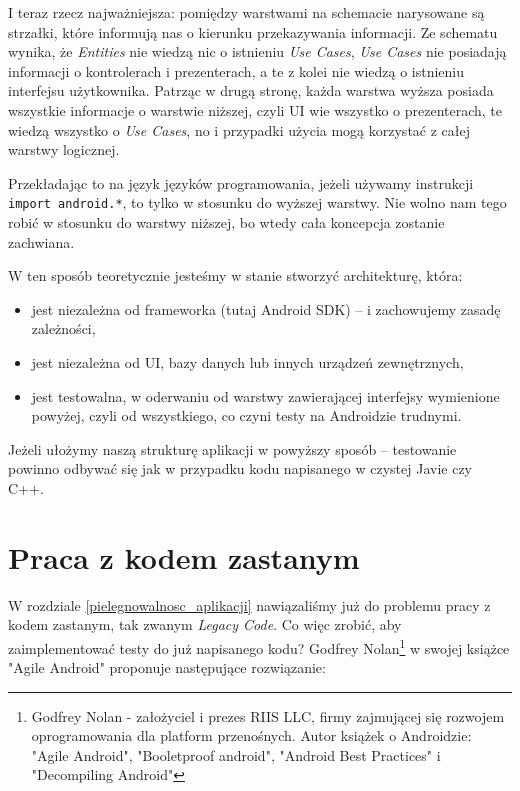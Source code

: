 I teraz rzecz najważniejsza: pomiędzy warstwami na schemacie narysowane są strzałki, które informują nas o kierunku przekazywania informacji. Ze schematu wynika, że \textit{Entities} nie wiedzą nic o istnieniu \textit{Use Cases}, \textit{Use Cases} nie posiadają informacji o kontrolerach i prezenterach, a te z kolei nie wiedzą o istnieniu interfejsu użytkownika. Patrząc w drugą stronę, każda warstwa wyższa posiada wszystkie informacje o warstwie niższej, czyli UI wie wszystko o prezenterach, te wiedzą wszystko o \textit{Use Cases}, no i przypadki użycia mogą korzystać z całej warstwy logicznej.

Przekładając to na język języków programowania, jeżeli używamy instrukcji \texttt{import android.*}, to tylko w stosunku do wyższej warstwy. Nie wolno nam tego robić w stosunku do warstwy niższej, bo wtedy cała koncepcja zostanie zachwiana.

W ten sposób teoretycznie jesteśmy w stanie stworzyć architekturę, która:
\begin{itemize}
\item
jest niezależna od frameworka (tutaj Android SDK) – i zachowujemy zasadę zależności,
\item
jest niezależna od UI, bazy danych lub innych urządzeń zewnętrznych,
\item
jest testowalna, w oderwaniu od warstwy zawierającej interfejsy wymienione powyżej, czyli od wszystkiego, co czyni testy na Androidzie trudnymi.
\end{itemize}

Jeżeli ułożymy naszą strukturę aplikacji w powyższy sposób – testowanie powinno odbywać się jak w przypadku kodu napisanego w czystej Javie czy C++.

\section{Praca z kodem zastanym}
\label{legacy_code}
W rozdziale \ref{pielegnowalnosc_aplikacji} nawiązaliśmy już do problemu pracy z kodem zastanym, tak zwanym \textit{Legacy Code}.
Co więc zrobić, aby zaimplementować testy do już napisanego kodu? Godfrey Nolan\footnote{Godfrey Nolan - założyciel i prezes RIIS LLC, firmy zajmującej się rozwojem oprogramowania dla platform przenośnych. Autor książek o Androidzie: "Agile Android", "Booletproof android", "Android Best Practices" i "Decompiling Android"} w swojej książce "Agile Android"\cite{bib:agile:android} proponuje następujące rozwiązanie:

